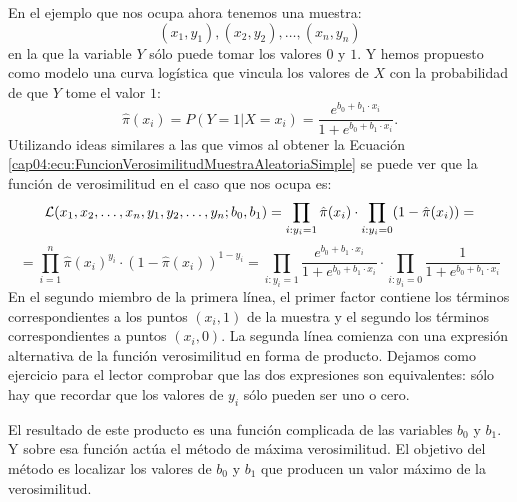 En el ejemplo que nos ocupa ahora tenemos una muestra:
 \[(x_1, y_1), (x_2, y_2), \ldots, (x_n, y_n)\]
en la que la variable $Y$ sólo puede tomar los valores $0$ y $1$. Y hemos propuesto como modelo una curva logística que vincula los valores de $X$ con la probabilidad de que $Y$ tome el valor $1$:
\[
\hat{\pi}(x_i) = P(Y=1|X=x_i)= \dfrac{e^{b_0+b_1\cdot x_i}}{1+e^{b_0+b_1\cdot x_i}}.
\]
Utilizando ideas similares a las que vimos al obtener la Ecuación \ref{cap04:ecu:FuncionVerosimilitudMuestraAleatoriaSimple}  se puede ver que la función de verosimilitud en el caso que nos ocupa es:
\begin{equation}
\label{cap13:ecu:FuncionVerosimilitudLogistica}
{\cal L}(x_1,x_2,\ldots,x_n, y_1, y_2, \ldots, y_n;b_0, b_1) =\prod_{i:y_i=1}\hat{\pi}(x_i)  \cdot \prod_{i:y_i=0}(1 - \hat{\pi}(x_i)) =
\end{equation}
\[
=\prod_{i=1}^ n\hat{\pi}(x_i)^{y_i} \cdot (1 - \hat{\pi}(x_i))^{1 - y_i} =
\prod_{i:y_i=1} \dfrac{e^{b_0+b_1\cdot x_i}}{1+e^{b_0+b_1\cdot x_i}}
\cdot \prod_{i:y_i=0}\dfrac{1}{1+e^{b_0+b_1\cdot x_i}}
\]
En el segundo miembro de la primera línea, el primer factor contiene los términos correspondientes a los puntos $(x_i, 1)$ de la muestra y el segundo los  términos correspondientes a puntos $(x_i, 0)$.  La segunda línea comienza con una expresión alternativa de la función verosimilitud en forma de producto. Dejamos como ejercicio para el lector comprobar que las dos expresiones son equivalentes: sólo hay que recordar que los valores de $y_i$ sólo pueden ser uno o cero.

El resultado de este producto es una función complicada de las variables $b_0$ y $b_1$.  Y sobre esa función actúa el método de máxima verosimilitud. El objetivo del método es localizar los valores de $b_0$ y $b_1$ que producen un valor máximo de la verosimilitud.

